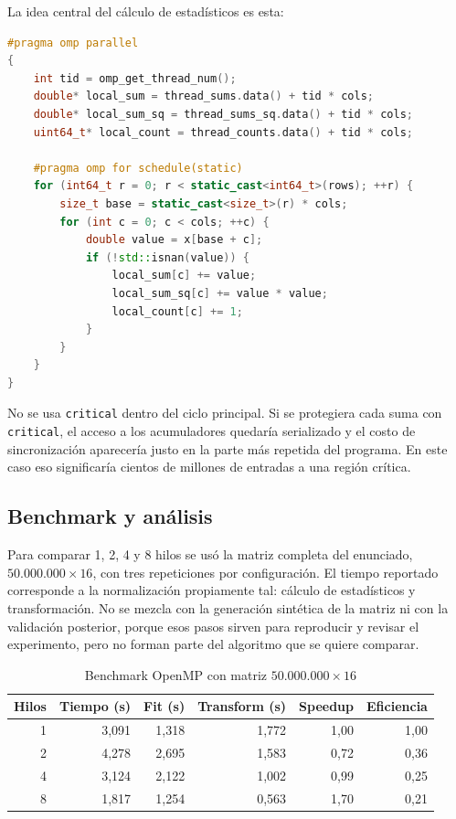 \documentclass[letterpaper,11pt]{article}
\begin{document}
La idea central del cálculo de estadísticos es esta:

\begin{lstlisting}[language=C++]
#pragma omp parallel
{
    int tid = omp_get_thread_num();
    double* local_sum = thread_sums.data() + tid * cols;
    double* local_sum_sq = thread_sums_sq.data() + tid * cols;
    uint64_t* local_count = thread_counts.data() + tid * cols;

    #pragma omp for schedule(static)
    for (int64_t r = 0; r < static_cast<int64_t>(rows); ++r) {
        size_t base = static_cast<size_t>(r) * cols;
        for (int c = 0; c < cols; ++c) {
            double value = x[base + c];
            if (!std::isnan(value)) {
                local_sum[c] += value;
                local_sum_sq[c] += value * value;
                local_count[c] += 1;
            }
        }
    }
}
\end{lstlisting}

No se usa \texttt{critical} dentro del ciclo principal. Si se protegiera cada suma con \texttt{critical}, el acceso a los acumuladores quedaría serializado y el costo de sincronización aparecería justo en la parte más repetida del programa. En este caso eso significaría cientos de millones de entradas a una región crítica.

\subsection{Benchmark y análisis}

Para comparar 1, 2, 4 y 8 hilos se usó la matriz completa del enunciado, \(50.000.000 \times 16\), con tres repeticiones por configuración. El tiempo reportado corresponde a la normalización propiamente tal: cálculo de estadísticos y transformación. No se mezcla con la generación sintética de la matriz ni con la validación posterior, porque esos pasos sirven para reproducir y revisar el experimento, pero no forman parte del algoritmo que se quiere comparar.

\begin{table}[H]
\centering
\caption{Benchmark OpenMP con matriz \(50.000.000 \times 16\)}
\begin{tabular}{rrrrrr}
\toprule
Hilos & Tiempo (s) & Fit (s) & Transform (s) & Speedup & Eficiencia \\
\midrule
1 & 3,091 & 1,318 & 1,772 & 1,00 & 1,00 \\
2 & 4,278 & 2,695 & 1,583 & 0,72 & 0,36 \\
4 & 3,124 & 2,122 & 1,002 & 0,99 & 0,25 \\
8 & 1,817 & 1,254 & 0,563 & 1,70 & 0,21 \\
\bottomrule
\end{tabular}
\end{table}
\end{document}
